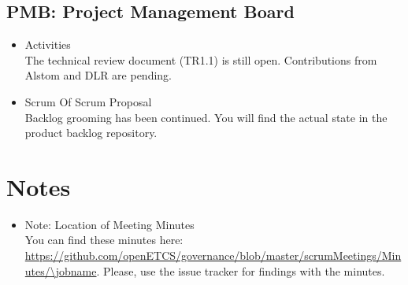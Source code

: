 \documentclass[a4paper, 11pt]{article}
\begin{document}
\subsection{PMB: Project Management Board}
\begin{itemize}

\item Activities\\
The technical review document (TR1.1) is still open. Contributions from Alstom and DLR are pending.

\item Scrum Of Scrum Proposal\\
Backlog grooming has been continued. You will find the actual state in the product backlog repository.

\end{itemize}

\section{Notes}
\begin{itemize}

\item Note: Location of Meeting Minutes\\
You can find these minutes here: \url{https://github.com/openETCS/governance/blob/master/scrumMeetings/Minutes/\jobname}. Please, use the issue tracker for findings with the minutes.

\end{itemize}
\end{document}
